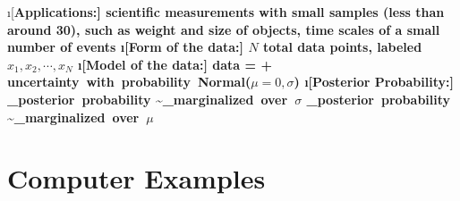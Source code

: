 	\i[\bf Applications:] scientific measurements with small samples (less than around 30), such as weight and size of objects, time scales of a small number of events
	\i[\bf Form of the data:] $N$ total data points, labeled $x_{1}, x_{2}, \cdots, x_{N}$
	\i[\bf Model of the data:] 
	\beqn
	{\rm data} = \mu + \mbox{uncertainty with probability Normal($\mu=0,\sigma$)}
	\eeqn
	\i[\bf Posterior Probability:]
	\beqn 
	_{\rm posterior\ probability} \sim {}_{\mbox{\scriptsize marginalized over $\sigma$}}
	\eeqn
	\beqn 
	_{\rm posterior\ probability} \sim {}_{\mbox{\scriptsize marginalized over $\mu$}}
	\eeqn
	\ei
\ee





\section{Computer Examples}
\begin{fullwidth}

\end{fullwidth}

